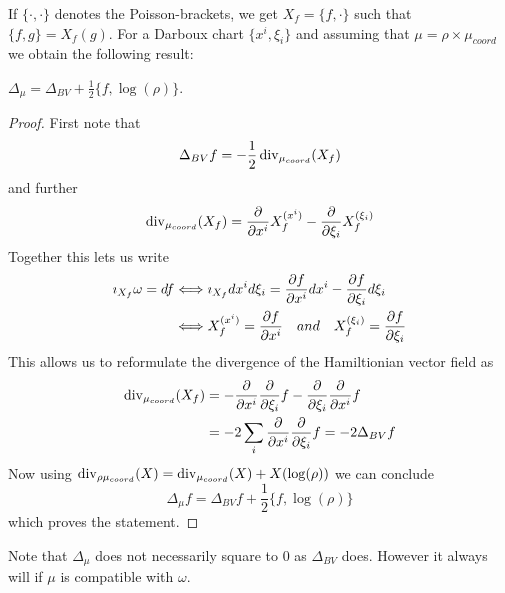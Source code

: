 If $\{\cdot, \cdot\}$ denotes the Poisson-brackets, we get $X_f = \{f, \cdot\}$ such that $\{f,g \} = X_f (g)$. For a Darboux chart $\{x^i, \xi_i\}$ and assuming that $\mu = \rho \times \mu_{coord}$ we obtain the following result:

\begin{lem}
  $\Delta_\mu = \Delta_{BV} + \frac{1}{2} \{f, \log(\rho)\}$.
\begin{proof}
  First note that
  \begin{equation}
    \Delta_{BV} f = - \frac{1}{2} \operatorname{div}_{\mu_{coord}}(X_f)
  \end{equation}
  and further
  \begin{equation}
    \operatorname{div}_{\mu_{coord}}(X_f) = \frac{\partial }{\partial x^i} X_f^{(x^i)} - \frac{\partial }{\partial \xi_i} X_f^{(\xi_i)}
  \end{equation}
  Together this lets us write
  \begin{align}
    \imath_{X_f} \omega = df &\Longleftrightarrow \imath_{X_f} dx^i d\xi_i = \frac{\partial f}{\partial x^i} dx^i - \frac{\partial f}{\partial \xi_i} d\xi_i \\
    & \Longleftrightarrow X_f^{(x^i)} = \frac{\partial f}{\partial x^i} \quad and \quad X_f^{(\xi_i)} = \frac{\partial f}{\partial \xi_i}
  \end{align}
  This allows us to reformulate the divergence of the Hamiltionian vector field as
  \begin{align}
    \operatorname{div}_{\mu_{coord}}(X_f) &= - \frac{\partial }{\partial x^i} \frac{\partial }{\partial \xi_i} f - \frac{\partial }{\partial \xi_i} \frac{\partial }{\partial x^i} f \\
    &= - 2 \sum_i \frac{\partial }{\partial x^i} \frac{\partial }{\partial \xi_i} f = - 2 \Delta_{BV} f
  \end{align}
  Now using $\operatorname{div}_{\rho \mu_{coord}} (X) = \operatorname{div}_{\mu_{coord}} (X) + X(\log(\rho))$ we can conclude
  \begin{equation}
    \Delta_\mu f = \Delta_{BV} f + \frac{1}{2} \{ f, \log(\rho) \}
  \end{equation}
  which proves the statement.
\end{proof}
\end{lem}

\begin{rem}
  Note that $\Delta_\mu$ does not necessarily square to $0$ as $\Delta_{BV}$ does. However it always will if $\mu$ is compatible with $\omega$.
\end{rem}








\newpage
